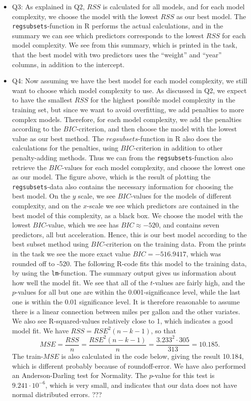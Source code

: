 \documentclass[]{article}
\begin{document}
\begin{itemize}
\item
  Q3: As explained in Q2, \(RSS\) is calculated for all models, and for
  each model complexity, we choose the model with the lowest \(RSS\) as
  our best model. The \texttt{regsubsets}-function in R performs the
  actual calculations, and in the summary we can see which predictors
  corresponds to the lowest \(RSS\) for each model complexity. We see
  from this summary, which is printed in the task, that the best model
  with two predictors uses the ``weight'' and ``year'' columns, in
  addition to the intercept.
\item
  Q4: Now assuming we have the best model for each model complexity, we
  still want to choose which model complexity to use. As discussed in
  Q2, we expect to have the smallest \(RSS\) for the highest possible
  model complexity in the training set, but since we want to avoid
  overfitting, we add penalties to more complex models. Therefore, for
  each model complexity, we add the penalties according to the
  \(BIC\)-criterion, and then choose the model with the lowest value as
  our best method. The \(regsubsets\)-function in R also does the
  calculations for the penalties, using \(BIC\)-criterion in addition to
  other penalty-adding methods. Thus we can from the
  \texttt{regsubsets}-function also retrieve the \(BIC\)-values for each
  model complexity, and choose the lowest one as our model. The figure
  above, which is the result of plotting the \texttt{regsubsets}-data
  also contains the necessary information for choosing the best model.
  On the \(y\) scale, we see \(BIC\)-values for the models of different
  complexity, and on the \(x\)-scale we see which predictors are
  contained in the best model of this complexity, as a black box. We
  choose the model with the lowest \(BIC\)-value, which we see has
  \(BIC\approx -520\), and contains seven predictors, all but
  acceleration. Hence, this is our best model according to the best
  subset method using \(BIC\)-criterion on the training data. From the
  prints in the task we see the more exact value \(BIC=-516.9417\),
  which was rounded off to -520. The following R-code fits this model to
  the training data, by using the \texttt{lm}-function. The summary
  output gives us information about how well the model fit. We see that
  all of the \(t\)-values are fairly high, and the \(p\)-values for all
  but one are within the 0.001-significance level, while the last one is
  within the 0.01 significance level. It is therefore reasonable to
  assume there is a linear connection between miles per gallon and the
  other variates. We also see R-squared-values relatively close to 1,
  which indicates a good model fit. We have \(RSS=RSE^2(n-k-1)\), so
  that
  \[MSE=\frac{RSS}{n}=\frac{RSE^2(n-k-1)}{n}=\frac{3.233^2\cdot 305}{313}=10.185.\]
  The train-\(MSE\) is also calculated in the code below, giving the
  result 10.184, which is different probably because of roundoff-error.
  We have also performed an Anderson-Darling test for Normality. The
  \(p\)-value for this test is \(9.241\cdot 10^{-6}\), which is very
  small, and indicates that our data does not have normal distributed
  errors. ???
\end{itemize}
\end{document}
